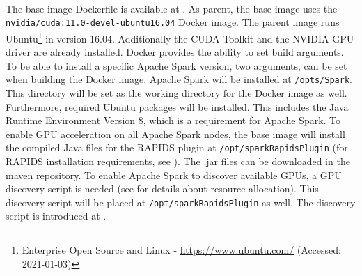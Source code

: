 \paragraph{}The base image Dockerfile is available at .
As parent, the base image uses the \texttt{nvidia/cuda:11.0-devel-ubuntu16.04} Docker image. The parent image runs Ubuntu\footnote{Enterprise Open Source and Linux - \url{https://www.ubuntu.com/} (Accessed: 2021-01-03)} in version 16.04. Additionally the CUDA Toolkit and the NVIDIA GPU driver are already installed.
Docker provides the ability to set build arguments. To be able to install a specific Apache Spark version, two arguments,  can be set when building the Docker image.
Apache Spark will be installed at \texttt{/opts/Spark}.
This directory will be set as the working directory for the Docker image as well.
Furthermore, required Ubuntu packages will be installed. This includes the Java Runtime Environment Version 8, which is a requirement for Apache Spark.
To enable GPU acceleration on all Apache Spark nodes, the base image will install the compiled Java files for the RAPIDS plugin at \texttt{/opt/sparkRapidsPlugin} (for RAPIDS installation requirements, see ). The .jar files can be downloaded in the maven repository.
To enable Apache Spark to discover available GPUs, a GPU discovery script is needed (see  for details about resource allocation). This discovery script will be placed at \texttt{/opt/sparkRapidsPlugin} as well. The discovery script is introduced at .








